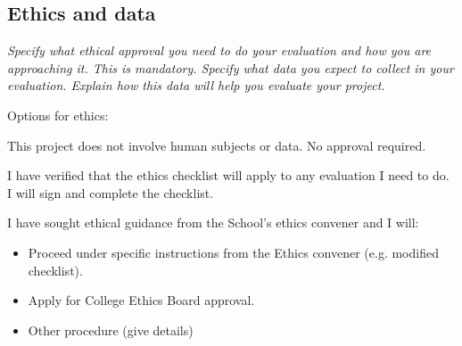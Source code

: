 \documentclass[11pt]{article}
\begin{document}
    
\subsection{Ethics and data}\label{ethics}
\emph{Specify what ethical approval you need to do your evaluation and how you are approaching it. This is mandatory. 
Specify what data you expect to collect in your evaluation. Explain how this data will help you evaluate your project.
}

Options for ethics:
\item This project does not involve human subjects or data. No approval required.
\item I have verified that the ethics checklist will apply to any evaluation I need to do. I will sign and complete the checklist.
\item I have sought ethical guidance from the School's ethics convener and I will:
\begin{itemize}
    \item Proceed under specific instructions from the Ethics convener (e.g. modified checklist).
    \item Apply for College Ethics Board approval.
    \item Other procedure (give details)
\end{itemize}    
\end{document}
